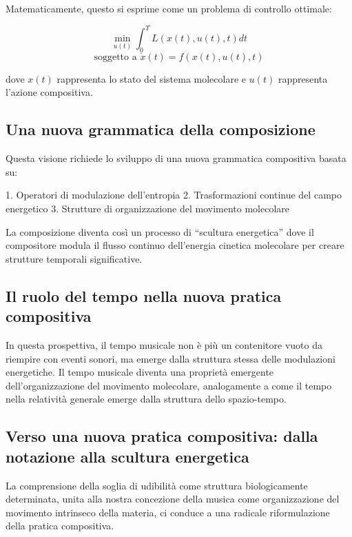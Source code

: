 \documentclass{gs-adonis}
\begin{document}
Matematicamente, questo si esprime come un problema di controllo
ottimale:

\[\min_{u(t)} \int_0^T L(x(t), u(t), t)dt\]
\[\text{soggetto a } \dot{x}(t) = f(x(t), u(t), t)\]

dove \(x(t)\) rappresenta lo stato del sistema molecolare e \(u(t)\)
rappresenta l'azione compositiva.

\subsection{Una nuova grammatica della
composizione}\label{una-nuova-grammatica-della-composizione}

Questa visione richiede lo sviluppo di una nuova grammatica compositiva
basata su:

1. Operatori di modulazione dell'entropia 2. Trasformazioni continue del
campo energetico 3. Strutture di organizzazione del movimento molecolare

La composizione diventa così un processo di ``scultura energetica'' dove
il compositore modula il flusso continuo dell'energia cinetica
molecolare per creare strutture temporali significative.

\subsection{Il ruolo del tempo nella nuova pratica
compositiva}\label{il-ruolo-del-tempo-nella-nuova-pratica-compositiva}

In questa prospettiva, il tempo musicale non è più un contenitore vuoto
da riempire con eventi sonori, ma emerge dalla struttura stessa delle
modulazioni energetiche. Il tempo musicale diventa una proprietà
emergente dell'organizzazione del movimento molecolare, analogamente a
come il tempo nella relatività generale emerge dalla struttura dello
spazio-tempo.

\subsection{Verso una nuova pratica compositiva: dalla notazione alla
scultura
energetica}\label{verso-una-nuova-pratica-compositiva-dalla-notazione-alla-scultura-energetica}

La comprensione della soglia di udibilità come struttura biologicamente
determinata, unita alla nostra concezione della musica come
organizzazione del movimento intrinseco della materia, ci conduce a una
radicale riformulazione della pratica compositiva.
\end{document}
